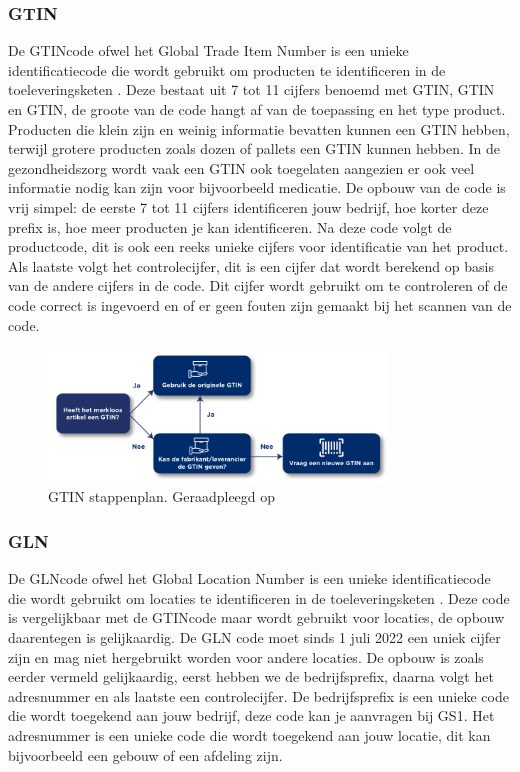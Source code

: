 \subsubsection{GTIN}
De GTIN\-code ofwel het Global Trade Item Number is een unieke identificatiecode die wordt gebruikt om producten te identificeren in de toeleveringsketen \autocite{GTIN2025}.
Deze bestaat uit 7 tot 11 cijfers benoemd met GTIN, GTIN en GTIN, de groote van de code hangt af van de toepassing en het type product.
Producten die klein zijn en weinig informatie bevatten kunnen een GTIN hebben, terwijl grotere producten zoals dozen of pallets een GTIN kunnen hebben.
In de gezondheidszorg wordt vaak een GTIN ook toegelaten aangezien er ook veel informatie nodig kan zijn voor bijvoorbeeld medicatie.
De opbouw van de code is vrij simpel: de eerste 7 tot 11 cijfers identificeren jouw bedrijf, hoe korter deze prefix is, hoe meer producten je kan identificeren.
Na deze code volgt de productcode, dit is ook een reeks unieke cijfers voor identificatie van het product.
Als laatste volgt het controlecijfer, dit is een cijfer dat wordt berekend op basis van de andere cijfers in de code.
Dit cijfer wordt gebruikt om te controleren of de code correct is ingevoerd en of er geen fouten zijn gemaakt bij het scannen van de code.

\begin{figure}[h]
     \centering
     \includegraphics[width=0.8\textwidth]{./img/GTIN.png}
     \caption[GTIN stappenplan]{\label{fig:gtin} GTIN stappenplan. Geraadpleegd op~\cite{GTIN2025} }
\end{figure}

\subsubsection{GLN}
De GLN\-code ofwel het Global Location Number is een unieke identificatiecode die wordt gebruikt om locaties te identificeren in de toeleveringsketen \autocite{GLN}.
Deze code is vergelijkbaar met de GTIN\-code maar wordt gebruikt voor locaties, de opbouw daarentegen is gelijkaardig.
De GLN code moet sinds 1 juli 2022 een uniek cijfer zijn en mag niet hergebruikt worden voor andere locaties.
De opbouw is zoals eerder vermeld gelijkaardig, eerst hebben we de bedrijfsprefix, daarna volgt het adresnummer en als laatste een controlecijfer.
De bedrijfsprefix is een unieke code die wordt toegekend aan jouw bedrijf, deze code kan je aanvragen bij GS1. Het adresnummer is een unieke code die wordt toegekend aan jouw locatie, dit kan bijvoorbeeld een gebouw of een afdeling zijn.


